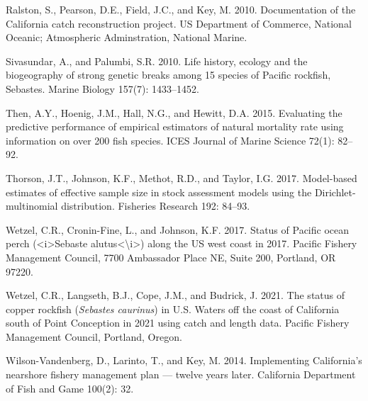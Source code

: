 \documentclass[11pt,
  english,
  a4paper,
]{article}
\newlength{\cslhangindent}
\newenvironment{CSLReferences}[2] %
 {%
  \setlength{\parindent}{0pt}
  \ifodd #1 \everypar{\setlength{\hangindent}{\cslhangindent}}\ignorespaces\fi
  \ifnum #2 > 0
  \setlength{\parskip}{#2\baselineskip}
  \fi
 }%
 {}
\begin{document}
\begin{CSLReferences}{1}{0}
\leavevmode{}%
Ralston, S., Pearson, D.E., Field, J.C., and Key, M. 2010. Documentation of the {California} catch reconstruction project. US Department of Commerce, National Oceanic; Atmospheric Adminstration, National Marine.

\leavevmode{}%
Sivasundar, A., and Palumbi, S.R. 2010. Life history, ecology and the biogeography of strong genetic breaks among 15 species of {Pacific} rockfish, {Sebastes}. Marine Biology 157(7): 1433--1452.

\leavevmode{}%
Then, A.Y., Hoenig, J.M., Hall, N.G., and Hewitt, D.A. 2015. Evaluating the predictive performance of empirical estimators of natural mortality rate using information on over 200 fish species. ICES Journal of Marine Science 72(1): 82--92.

\leavevmode{}%
Thorson, J.T., Johnson, K.F., Methot, R.D., and Taylor, I.G. 2017. Model-based estimates of effective sample size in stock assessment models using the {Dirichlet}-multinomial distribution. Fisheries Research 192: 84--93.

\leavevmode{}%
Wetzel, C.R., Cronin-Fine, L., and Johnson, K.F. 2017. Status of {Pacific} ocean perch ({\textless{}}i{\textgreater{}}{Sebaste} alutus{\textless{}}{\textbackslash{}}i{\textgreater{}}) along the {US} west coast in 2017. Pacific Fishery Management Council, 7700 Ambassador Place NE, Suite 200, Portland, OR 97220.

\leavevmode{}%
Wetzel, C.R., Langseth, B.J., Cope, J.M., and Budrick, J. 2021. The status of copper rockfish (\emph{{Sebastes} caurinus}) in {U}.{S}. Waters off the coast of {California} south of {Point} {Conception} in 2021 using catch and length data. Pacific Fishery Management Council, Portland, Oregon.

\leavevmode{}%
Wilson-Vandenberg, D., Larinto, T., and Key, M. 2014. Implementing {California}'s nearshore fishery management plan --- twelve years later. California Department of Fish and Game 100(2): 32.

\end{CSLReferences}

\leavevmode\tagmcend\tagstructend
\end{document}

